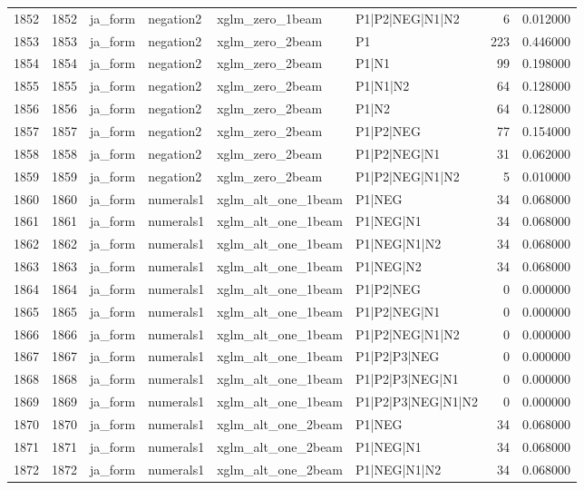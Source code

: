 \begin{tabular}{lrllllrr}
1852 & 1852 & ja_form & negation2 & xglm_zero_1beam & P1|P2|NEG|N1|N2 & 6 & 0.012000 \\
1853 & 1853 & ja_form & negation2 & xglm_zero_2beam & P1 & 223 & 0.446000 \\
1854 & 1854 & ja_form & negation2 & xglm_zero_2beam & P1|N1 & 99 & 0.198000 \\
1855 & 1855 & ja_form & negation2 & xglm_zero_2beam & P1|N1|N2 & 64 & 0.128000 \\
1856 & 1856 & ja_form & negation2 & xglm_zero_2beam & P1|N2 & 64 & 0.128000 \\
1857 & 1857 & ja_form & negation2 & xglm_zero_2beam & P1|P2|NEG & 77 & 0.154000 \\
1858 & 1858 & ja_form & negation2 & xglm_zero_2beam & P1|P2|NEG|N1 & 31 & 0.062000 \\
1859 & 1859 & ja_form & negation2 & xglm_zero_2beam & P1|P2|NEG|N1|N2 & 5 & 0.010000 \\
1860 & 1860 & ja_form & numerals1 & xglm_alt_one_1beam & P1|NEG & 34 & 0.068000 \\
1861 & 1861 & ja_form & numerals1 & xglm_alt_one_1beam & P1|NEG|N1 & 34 & 0.068000 \\
1862 & 1862 & ja_form & numerals1 & xglm_alt_one_1beam & P1|NEG|N1|N2 & 34 & 0.068000 \\
1863 & 1863 & ja_form & numerals1 & xglm_alt_one_1beam & P1|NEG|N2 & 34 & 0.068000 \\
1864 & 1864 & ja_form & numerals1 & xglm_alt_one_1beam & P1|P2|NEG & 0 & 0.000000 \\
1865 & 1865 & ja_form & numerals1 & xglm_alt_one_1beam & P1|P2|NEG|N1 & 0 & 0.000000 \\
1866 & 1866 & ja_form & numerals1 & xglm_alt_one_1beam & P1|P2|NEG|N1|N2 & 0 & 0.000000 \\
1867 & 1867 & ja_form & numerals1 & xglm_alt_one_1beam & P1|P2|P3|NEG & 0 & 0.000000 \\
1868 & 1868 & ja_form & numerals1 & xglm_alt_one_1beam & P1|P2|P3|NEG|N1 & 0 & 0.000000 \\
1869 & 1869 & ja_form & numerals1 & xglm_alt_one_1beam & P1|P2|P3|NEG|N1|N2 & 0 & 0.000000 \\
1870 & 1870 & ja_form & numerals1 & xglm_alt_one_2beam & P1|NEG & 34 & 0.068000 \\
1871 & 1871 & ja_form & numerals1 & xglm_alt_one_2beam & P1|NEG|N1 & 34 & 0.068000 \\
1872 & 1872 & ja_form & numerals1 & xglm_alt_one_2beam & P1|NEG|N1|N2 & 34 & 0.068000 \\

\end{tabular}
